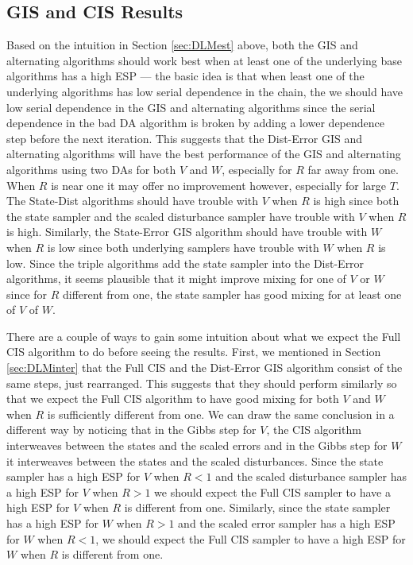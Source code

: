 \documentclass{article}
\begin{document}
\subsection{GIS and CIS Results}

Based on the intuition in Section \ref{sec:DLMest} above, both the GIS and alternating algorithms should work best when at least one of the underlying base algorithms has a high ESP --- the basic idea is that when least one of the underlying algorithms has low serial dependence in the chain, the we should have low serial dependence in the GIS and alternating algorithms since the serial dependence in the bad DA algorithm is broken by adding a lower dependence step before the next iteration. This suggests that the Dist-Error GIS and alternating algorithms will have the best performance of the GIS and alternating algorithms using two DAs for both $V$ and $W$, especially for $R$ far away from one. When $R$ is near one it may offer no improvement however, especially for large $T$. The State-Dist algorithms should have trouble with $V$ when $R$ is high since both the state sampler and the scaled disturbance sampler have trouble with $V$ when $R$ is high. Similarly, the State-Error GIS algorithm should have trouble with $W$ when $R$ is low since both underlying samplers have trouble with $W$ when $R$ is low. Since the triple algorithms add the state sampler into the Dist-Error algorithms, it seems plausible that it might improve mixing for one of $V$ or $W$ since for $R$ different from one, the state sampler has good mixing for at least one of $V$ of $W$. 

There are a couple of ways to gain some intuition about what we expect the Full CIS algorithm to do before seeing the results. First, we mentioned in Section \ref{sec:DLMinter} that the Full CIS and the Dist-Error GIS algorithm consist of the same steps, just rearranged. This suggests that they should perform similarly so that we expect the Full CIS algorithm to have good mixing for both $V$ and $W$ when $R$ is sufficiently different from one. We can draw the same conclusion in a different way by noticing that in the Gibbs step for $V$, the CIS algorithm interweaves between the states and the scaled errors and in the Gibbs step for $W$ it interweaves between the states and the scaled disturbances. Since the state sampler has a high ESP for $V$ when $R<1$ and the scaled disturbance sampler has a high ESP for $V$ when $R>1$ we should expect the Full CIS sampler to have a high ESP for $V$ when $R$ is different from one. Similarly, since the state sampler has a high ESP for $W$ when $R>1$ and the scaled error sampler has a high ESP for $W$ when $R<1$, we should expect the Full CIS sampler to have a high ESP for $W$ when $R$ is different from one.
\end{document}
